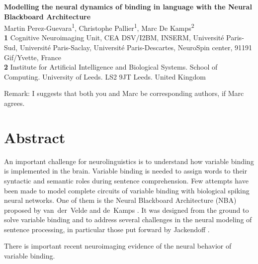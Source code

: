 \documentclass[10pt]{article}
\date{}
\begin{document}
\vspace*{0.2in}

\begin{flushleft} {\LARGE \textbf{Modelling the neural dynamics of
      binding in language with the Neural Blackboard Architecture} }
  \newline
  \\

  Martin Perez-Guevara\textsuperscript{1}, Christophe Pallier\textsuperscript{1}, Marc De Kamps\textsuperscript{2}
  \\
  \bigskip \textbf{1} Cognitive Neuroimaging Unit, CEA DSV/I2BM,
  INSERM, Université Paris-Sud, Université Paris-Saclay,
  Université Paris-Descartes, NeuroSpin center, 91191 Gif/Yvette, France
  \\
  \textbf{2} Institute for Artificial Intelligence and Biological
  Systems. School of Computing. University of Leeds. LS2 9JT Leeds.
  United Kingdom
  \\
  \bigskip

Remark: I suggests that both you and Marc be corresponding authors, if Marc agrees.
  
\end{flushleft}


\section*{Abstract}

An important challenge for neurolinguistics is to understand how
variable binding is implemented in the brain. Variable binding is
needed to assign words to their syntactic and semantic roles during
sentence comprehension. Few attempts have been made to model complete
circuits of variable binding with biological spiking neural networks.
One of them is the Neural Blackboard Architecture (NBA) proposed by
van~der~Velde and de~Kamps \cite{van_der_Velde_2006}. It was designed
from the ground to solve variable binding and to address several
challenges in the neural modeling of sentence processing, in
particular those put forward by Jackendoff \cite{Jackendoff_2002b}.

There is important recent neuroimaging evidence of the neural behavior of variable binding.
\end{document}
